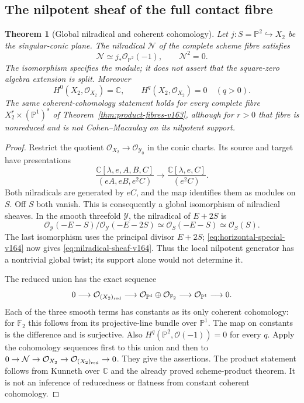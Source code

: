 \documentclass[11pt,reqno]{amsart}
\numberwithin{equation}{section}
\newtheorem{theorem}{Theorem}[section]
\theoremstyle{definition}\newtheorem{definition}[theorem]{Definition}
\theoremstyle{remark}\newtheorem{remark}[theorem]{Remark}
\newcommand{\C}{\mathbb C}\newcommand{\Q}{\mathbb Q}
\newcommand{\Pj}{\mathbb P}\newcommand{\A}{\mathbb A}
\newcommand{\OO}{\mathcal O}\newcommand{\II}{\mathcal I}
\begin{document}
\subsection{The nilpotent sheaf of the full contact fibre}
\begin{theorem}[Global nilradical and coherent cohomology]
\label{thm:nilradical-sheaf-v164}
Let $j:S=\Pj^2\hookrightarrow X_2$ be the singular-conic plane.
The nilradical $\mathcal N$ of the complete scheme fibre satisfies
\begin{equation}\label{eq:nilradical-sheaf-v164}
                \mathcal N\simeq j_*\OO_{\Pj^2}(-1),
                         \qquad\mathcal N^2=0.
\end{equation}
The isomorphism specifies the module; it does not assert that the
square-zero algebra extension is split. Moreover
\[
 H^0(X_2,\OO_{X_2})=\C,\qquad
 H^q(X_2,\OO_{X_2})=0\quad(q>0).
\]
The same coherent-cohomology statement holds for every complete
fibre $X_2^r\times(\Pj^1)^s$ of
Theorem~\ref{thm:product-fibres-v163}, although for $r>0$ that
fibre is nonreduced and is not Cohen--Macaulay on its nilpotent support.
\end{theorem}
\begin{proof}
Restrict the quotient $\OO_{X_2}\to\OO_{\mathcal Y_0}$ in the
conic charts. Its source and target have presentations
\[
 \frac{\C[\lambda,e,A,B,C]}{(eA,eB,e^2C)}
       \longrightarrow
 \frac{\C[\lambda,e,C]}{(e^2C)}.
\]
Both nilradicals are generated by $eC$, and the map identifies
them as modules on $S$. Off $S$ both vanish. This is consequently
a global isomorphism of nilradical sheaves.
In the smooth threefold $\mathcal Y$, the nilradical of $E+2S$ is
\[
 \OO_{\mathcal Y}(-E-S)/\OO_{\mathcal Y}(-E-2S)
            \simeq\OO_S(-E-S)\simeq\OO_S(S).
\]
The last isomorphism uses the principal divisor $E+2S$;
\eqref{eq:horizontal-special-v164} now gives
\eqref{eq:nilradical-sheaf-v164}. Thus the local nilpotent generator
has a nontrivial global twist; its support alone would not determine it.

The reduced union has the exact sequence
\[
 0\longrightarrow\OO_{(X_2)_{\rm red}}\longrightarrow
 \OO_{\Pj^4}\oplus\OO_{\mathbb F_2}
 \longrightarrow\OO_{\Pj^1}\longrightarrow0.
\]
Each of the three smooth terms has constants as its only coherent
cohomology: for $\mathbb F_2$ this follows from its projective-line
bundle over $\Pj^1$. The map on constants is the difference and is
surjective. Also $H^q(\Pj^2,\OO(-1))=0$ for every $q$.
Apply the cohomology sequences first to this union and then to
$0\to\mathcal N\to\OO_{X_2}\to\OO_{(X_2)_{\rm red}}\to0$.
They give the assertions. The product statement follows from
Kunneth over $\C$ and the already proved scheme-product theorem.
It is not an inference of reducedness or flatness from constant
coherent cohomology.
\end{proof}
\end{document}
